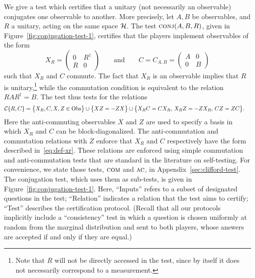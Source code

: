 We give a test which certifies that a unitary (not necessarily an observable) conjugates one observable to another. More precisely, let $A,B$ be observables, and $R$ a unitary, acting on the same space $\mathcal{H}$. The test $\textsc{conj}(A,B,R)$, given in Figure~\ref{fig:conjugation-test-1}, certifies that the players implement observables of the form
\begin{equation}\label{eq:def-xr}
X_R = \begin{pmatrix} 0 & R^\dagger\\ R & 0 \end{pmatrix}\qquad \text{and}\qquad C = C_{A,B} = \begin{pmatrix} A & 0\\ 0 & B \end{pmatrix}
\end{equation}
such that $X_R$ and $C$ commute. The fact that $X_R$ is an observable implies that $R$ is unitary,\footnote{Note that $R$ will not be directly accessed in the test, since by itself it does not necessarily correspond to a measurement.} while the commutation condition is equivalent to the relation $RAR^\dagger = B$. The test thus tests for the relations
\begin{align*}
 \mathcal{C}\{R,C\} &= \big\{ X_R,C,X,Z\in \mathrm{Obs}\big\} \cup \big\{XZ=-ZX\big\}
\cup \big\{ X_R C = C X_R,\, X_RZ=-Z X_R,\, C Z=ZC\big\}.
\end{align*}
Here the anti-commuting observables $X$ and $Z$ are used to specify a basis in which $X_R$ and $C$ can be block-diagonalized. The anti-commutation and commutation relations with $Z$ enforce that $X_R$ and $C$ respectively have the form described in~\eqref{eq:def-xr}.
These relations are enforced using simple commutation and anti-commutation tests that are standard in the literature on self-testing. For convenience, we state those tests, $\textsc{com}$ and $\textsc{ac}$, in Appendix~\ref{sec:clifford-test}. The conjugation test, which uses them as sub-tests, is given in Figure~\ref{fig:conjugation-test-1}. Here, ``Inputs'' refers to a subset of designated questions in the test; ``Relation'' indicates a relation that the test aims to certify; ``Test'' describes the certification protocol. (Recall that all our protocols implicitly include a ``consistency'' test in which a question is chosen uniformly at random from the marginal distribution and sent to both players, whose answers are accepted if and only if they are equal.)

